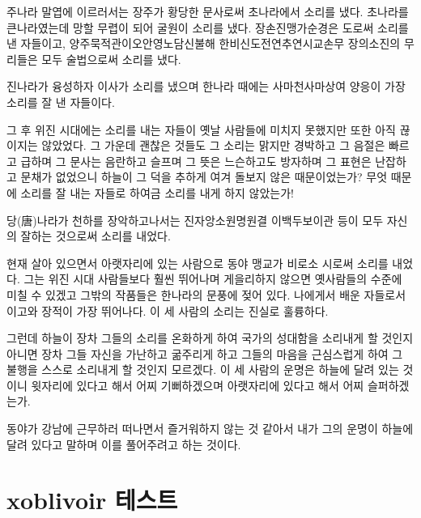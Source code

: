\documentclass[demo,chapter,openany,amsmath,gremph,lwarp]{oblivoir}
\begin{document}
주나라 말엽에 이르러서는 장주가 황당한 문사로써 초나라에서
소리를 냈다. 초나라를 큰나라였는데 망할 무렵이 되어 굴원이 소리를 냈다.
장손진\cntrdot 맹가\cntrdot 순경은 도로써 소리를 낸 자들이고,
양주\cntrdot 묵적\cntrdot 관이오\cntrdot 안영\cntrdot 노담\cntrdot 신불해\cntrdot 
한비\cntrdot 신도\cntrdot 전연\cntrdot 추연\cntrdot 시교\cntrdot 손무\cntrdot 
장의\cntrdot 소진의 무리들은 모두 술법으로써 소리를 냈다.

진나라가 융성하자 이사가 소리를 냈으며 한나라 때에는 사마천\cntrdot 사마상여\cntrdot 
양응이 가장 소리를 잘 낸 자들이다.

그 후 위\cntrdot 진 시대에는 소리를 내는 자들이 옛날 사람들에 미치지 못했지만
또한 아직 끊이지는 않았었다. 그 가운데 괜찮은 것들도 그 소리는 맑지만
경박하고 그 음절은 빠르고 급하며 그 문사는 음란하고 슬프며
그 뜻은 느슨하고도 방자하며 그 표현은 난잡하고 문채가 없었으니
하늘이 그 덕을 추하게 여겨 돌보지 않은 때문이었는가? 무엇 때문에
소리를 잘 내는 자들로 하여금 소리를 내게 하지 않았는가!

당(唐)나라가 천하를 장악하고나서는 진자앙\cntrdot 소원명\cntrdot 원결\cntrdot 
이백\cntrdot 두보\cntrdot 이관 등이 모두 자신의 잘하는 것으로써 소리를 내었다.

현재 살아 있으면서 아랫자리에 있는 사람으로 동야 맹교가 비로소 시로써
소리를 내었다. 그는 위\cntrdot 진 시대 사람들보다 훨씬 뛰어나며
게을리하지 않으면 옛사람들의 수준에 미칠 수 있겠고
그밖의 작품들은 한나라의 문풍에 젖어 있다. 나에게서 배운 자들로서
이고와 장적이 가장 뛰어나다. 이 세 사람의 소리는 진실로 훌륭하다.

그런데 하늘이 장차 그들의 소리를 온화하게 하여 국가의 성대함을 소리내게
할 것인지 아니면 장차 그들 자신을 가난하고 굶주리게 하고
그들의 마음을 근심스럽게 하여 그 불행을 스스로 소리내게 할 것인지 모르겠다.
이 세 사람의 운명은 하늘에 달려 있는 것이니 윗자리에 있다고 해서 어찌
기뻐하겠으며 아랫자리에 있다고 해서 어찌 슬퍼하겠는가.

동야가 강남에 근무하러 떠나면서 즐거워하지 않는 것 같아서 내가 그의
운명이 하늘에 달려 있다고 말하며 이를 풀어주려고 하는 것이다.


\part{xoblivoir 테스트}

\pagestyle{companion}
\end{document}
